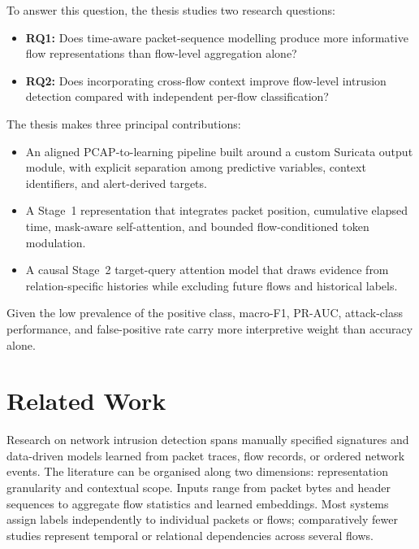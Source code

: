 \documentclass[11pt,fleqn]{report}
\begin{document}
To answer this question, the thesis studies two research questions:

\begin{itemize}
    \item \textbf{RQ1:} Does time-aware packet-sequence modelling produce more informative flow representations than flow-level aggregation alone?
    \item \textbf{RQ2:} Does incorporating cross-flow context improve flow-level intrusion detection compared with independent per-flow classification?
\end{itemize}

The thesis makes three principal contributions:

\begin{itemize}
    \item An aligned PCAP-to-learning pipeline built around a custom Suricata output module, with explicit separation among predictive variables, context identifiers, and alert-derived targets.
    \item A Stage~1 representation that integrates packet position, cumulative elapsed time, mask-aware self-attention, and bounded flow-conditioned token modulation.
    \item A causal Stage~2 target-query attention model that draws evidence from relation-specific histories while excluding future flows and historical labels.
\end{itemize}

Given the low prevalence of the positive class, macro-F1, PR-AUC, attack-class performance, and false-positive rate carry more interpretive weight than accuracy alone.

\chapter{Related Work}
\label{sec:related_work}

Research on network intrusion detection spans manually specified signatures and data-driven models learned from packet traces, flow records, or ordered network events. The literature can be organised along two dimensions: representation granularity and contextual scope. Inputs range from packet bytes and header sequences to aggregate flow statistics and learned embeddings. Most systems assign labels independently to individual packets or flows; comparatively fewer studies represent temporal or relational dependencies across several flows.
\end{document}
